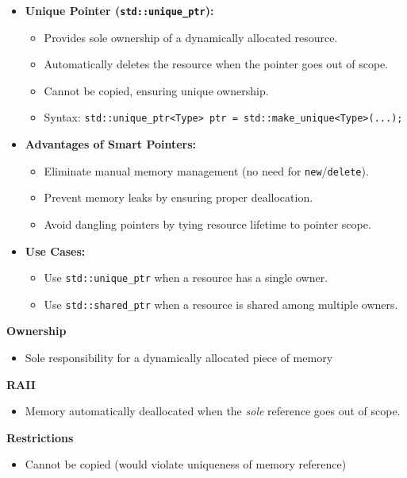 \documentclass{report}
\begin{document}
\begin{itemize}
	\item \textbf{Unique Pointer (\texttt{std::unique\_ptr}):}
	\begin{itemize}
		\item Provides sole ownership of a dynamically allocated resource.
		\item Automatically deletes the resource when the pointer goes out of scope.
		\item Cannot be copied, ensuring unique ownership.
		\item Syntax: \texttt{std::unique\_ptr<Type> ptr = std::make\_unique<Type>(...);}
	\end{itemize}
	\item \textbf{Advantages of Smart Pointers:}
	\begin{itemize}
		\item Eliminate manual memory management (no need for \texttt{new}/\texttt{delete}).
		\item Prevent memory leaks by ensuring proper deallocation.
		\item Avoid dangling pointers by tying resource lifetime to pointer scope.
	\end{itemize}

	\item \textbf{Use Cases:}
	\begin{itemize}
		\item Use \texttt{std::unique\_ptr} when a resource has a single owner.
		\item Use \texttt{std::shared\_ptr} when a resource is shared among multiple owners.
	\end{itemize}
\end{itemize}


\textbf{Ownership}
\begin{itemize}
    \item Sole responsibility for a dynamically allocated piece of memory
\end{itemize}

\textbf{RAII}
\begin{itemize}
    \item Memory automatically deallocated when the \textit{sole} reference goes out of scope.
\end{itemize}

\textbf{Restrictions}
\begin{itemize}
    \item Cannot be copied (would violate uniqueness of memory reference)
\end{itemize}
\end{document}
